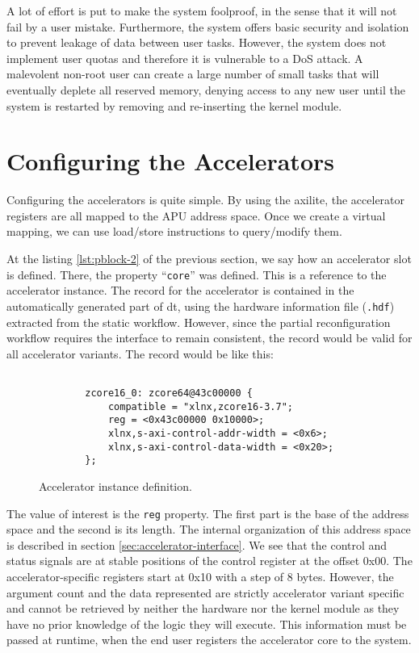 A lot of effort is put to make the system foolproof, in the sense that it will not fail by a user mistake.
Furthermore, the system offers basic security and isolation to prevent leakage of data between user tasks.
However, the system does not implement user quotas and therefore
it is vulnerable to a DoS attack. A malevolent non-root user can create a large number of small tasks that will
eventually deplete all reserved memory, denying access to any new user until the system is restarted
by removing and re-inserting the kernel module.


\section{Configuring the Accelerators}

Configuring the accelerators is quite simple. By using the \gls{axilite}, the accelerator registers
are all mapped to the APU address space. Once we create a virtual mapping, we can use
load/store instructions to query/modify them.

At the listing \ref{lst:pblock-2} of the previous section, we say how an accelerator slot is
defined. There, the property ``\texttt{core}'' was defined. This is a reference to the accelerator
instance. The record for the accelerator is contained in the automatically generated part
of \gls{dt}, using the hardware information file (\texttt{.hdf}) extracted from the static workflow.
However, since the partial reconfiguration workflow requires the interface to remain consistent,
the record would be valid for all accelerator variants. The record would be like this:

\begin{figure}[H]
\centering
\begin{lstlisting}[style=basic]

		zcore16_0: zcore64@43c00000 {
			compatible = "xlnx,zcore16-3.7";
			reg = <0x43c00000 0x10000>;
			xlnx,s-axi-control-addr-width = <0x6>;
			xlnx,s-axi-control-data-width = <0x20>;
		};
\end{lstlisting}
\caption{Accelerator instance definition.}
\label{lst:accelerator-2}
\end{figure}

The value of interest is the \texttt{reg} property. The first part is the base of the address space 
and the second is its length. The internal organization of this address space is described in section 
\ref{sec:accelerator-interface}. We see that the control and status signals are at stable positions
of the control register at the offset 0x00. The accelerator-specific registers start at 0x10 with a
step of 8 bytes. However, the argument count and the data represented are strictly accelerator variant
specific and cannot be retrieved by neither the hardware nor the kernel module as they have no
prior knowledge of the logic they will execute.
This information must be passed at runtime, when the end user registers the accelerator core to the system.

